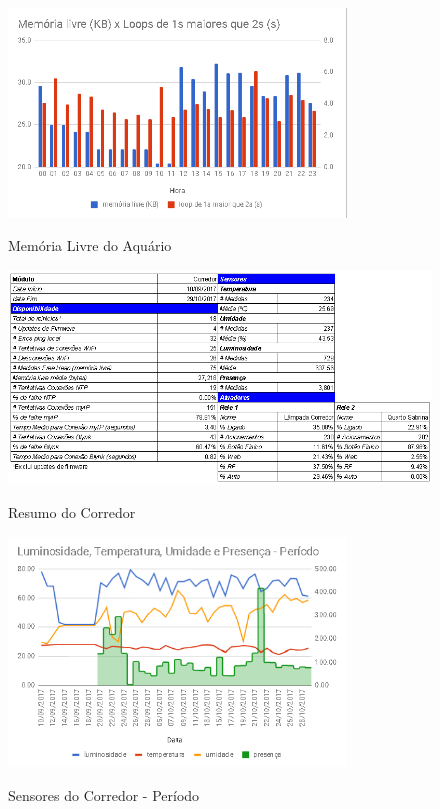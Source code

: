 \begin{figure}[H]
	\centering
	\caption{Memória Livre do Aquário}
	\includegraphics[width=0.8\textwidth]{MemLivreAqua}
	\label{fig:MemLivreAqua}
\end{figure}

\begin{figure}[H]
	\centering
	\caption{Resumo do Corredor}
	\includegraphics[width=1.0\textwidth]{resumoCorredor}
	\label{fig:resumoCorredor}
\end{figure}

\begin{figure}[H]
	\centering
	\caption{Sensores do Corredor - Período}
	\includegraphics[width=0.8\textwidth]{sensoresperiodoCorredor}
	\label{fig:sensoresperiodoCorredor}
\end{figure}

